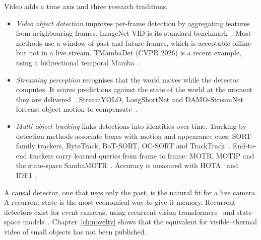 Video adds a time axis and three research traditions.
\begin{itemize}
  \item \emph{Video object detection} improves per-frame detection by
        aggregating features from neighbouring frames. ImageNet VID is its
        standard benchmark~\citep{russakovsky2015imagenet}. Most methods use a
        window of past and future frames, which is acceptable offline but
        not in a live stream. TMambaDet (CVPR 2026) is a recent example,
        using a bidirectional temporal Mamba~\citep{tmambadet2026}.
  \item \emph{Streaming perception} recognises that the world moves while
        the detector computes. It scores predictions against the state of
        the world at the moment they are delivered~\citep{li2020streaming}.
        StreamYOLO, LongShortNet and DAMO-StreamNet forecast object motion to
        compensate~\citep{yang2022streamyolo,li2023longshortnet,he2023damostreamnet}.
  \item \emph{Multi-object tracking} links detections into identities over
        time. Tracking-by-detection methods associate boxes with motion and
        appearance cues: SORT-family trackers, ByteTrack, BoT-SORT,
        OC-SORT and TrackTrack~\citep{zhang2022bytetrack,aharon2022botsort,cao2023ocsort,shim2025tracktrack}.
        End-to-end trackers carry learned queries from frame to frame:
        MOTR, MOTIP and the state-space SambaMOTR~\citep{zhang2023motrv2,gao2025motip,segu2025sambamotr}.
        Accuracy is measured with HOTA~\citep{luiten2021hota} and
        IDF1~\citep{ristani2016idf1}.
\end{itemize}
A causal detector, one that uses only the past, is the natural fit for a
live camera. A recurrent state is the most economical way to give it
memory. Recurrent detectors exist for event cameras, using recurrent vision
transformers~\citep{gehrig2023rvt} and state-space
models~\citep{zubic2024ssmevent}. Chapter~\ref{ch:novelty} shows that the
equivalent for visible--thermal video of small objects has not been
published.
